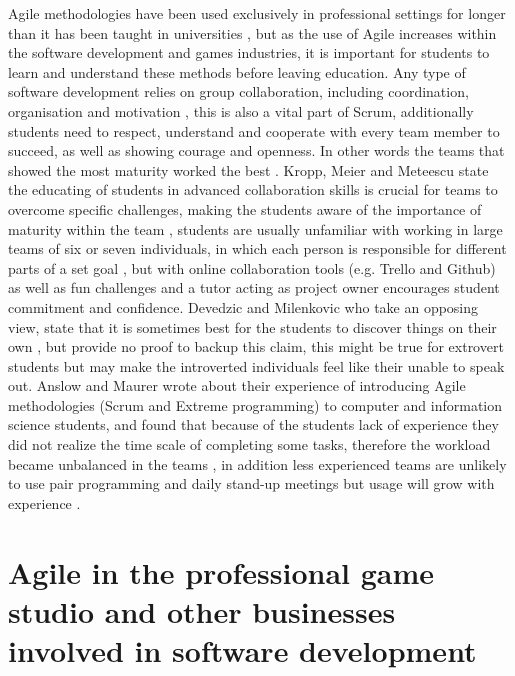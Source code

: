 \documentclass{scrartcl}
\begin{document}
Agile methodologies have been used exclusively in professional settings for longer than it has been taught in universities \cite{kropp2016teaching}, but as the use of Agile increases within the software development and games industries, it is important for students to learn and understand these methods before leaving education\cite{anslow2015experience}. Any type of software development relies on group collaboration, including coordination, organisation and motivation \cite{schroeder2012teaching}, this is also a vital part of Scrum, additionally students need to respect, understand and cooperate with every team member to succeed, as well as showing courage and openness. In other words the teams that showed the most maturity worked the best \cite{kropp2016teaching}\cite{beck2000extreme}. Kropp, Meier and Meteescu state the educating of students in advanced collaboration skills is crucial for teams to overcome specific challenges, making the students aware of the importance of maturity within the team \cite{kropp2014teaching}, students are usually unfamiliar with working in large teams of six or seven individuals, in which each person is responsible for different parts of a set goal \cite{kropp2016collaboration}, but with online collaboration tools (e.g. Trello and Github) as well as fun challenges and a tutor acting as project owner encourages student commitment and confidence\cite{kropp2016teaching}\cite{anslow2015experience}. Devedzic and Milenkovic who take an opposing view, state that it is sometimes best for the students to discover things on their own \cite{devedzic2011teaching}, but provide no proof to backup this claim, this might be true for extrovert students but may make the introverted individuals feel like their unable to speak out. Anslow and Maurer wrote about their experience of introducing Agile methodologies (Scrum and Extreme programming) to computer and information science students, and found that because of the students lack of experience they did not realize the time scale of completing some tasks, therefore the workload became unbalanced in the teams \cite{anslow2015experience}, in addition less experienced teams are unlikely to use pair programming and daily stand-up meetings but usage will grow with experience \cite{kropp2016collaboration}.

\section{Agile in the professional game studio and other businesses involved in software development}
\end{document}
